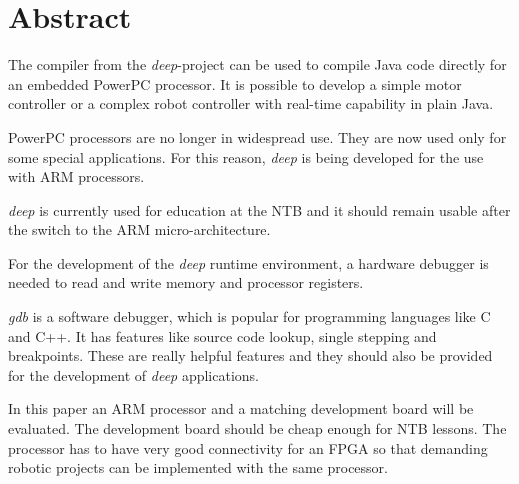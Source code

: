 
\chapter*{Abstract}


The compiler from the \textit{deep}-project can be used to compile Java code directly for an embedded PowerPC processor.
It is possible to develop a simple motor controller or a complex robot controller with real-time capability in plain Java.


PowerPC processors are no longer in widespread use.
They are now used only for some special applications.
For this reason, \textit{deep} is being developed for the use with ARM processors.

\textit{deep} is currently used for education at the NTB and it should remain usable after the switch to the ARM micro-architecture.

For the development of the \textit{deep} runtime environment, a hardware debugger is needed to read and write memory and processor registers.

\textit{gdb} is a software debugger, which is popular for programming languages like C and C++.
It has features like source code lookup, single stepping and breakpoints.
These are really helpful features and they should also be provided for the development of \textit{deep} applications.

In this paper an ARM processor and a matching development board will be evaluated.
The development board should be cheap enough for NTB lessons.
The processor has to have very good connectivity for an FPGA so that demanding robotic projects can be implemented with the same processor.


